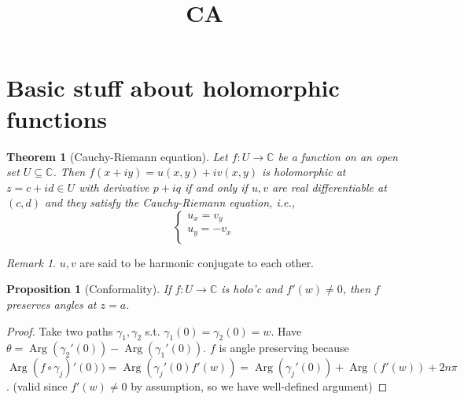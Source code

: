 \documentclass{article}
\title{CA}
\author{ }
\date{ }
\theoremstyle{definition}
\theoremstyle{remark}
\newtheorem{rem}{Remark}
\theoremstyle{plain}
\newtheorem{thm}[defn]{Theorem}
\newtheorem{prop}[defn]{Proposition}
\newcommand{\CC}{\mathbb{C}}
\begin{document}
\maketitle

\section{Basic stuff about holomorphic functions}
\begin{thm}[Cauchy-Riemann equation]
   Let $f:U\to \CC$ be a function on an open set $U\subseteq\CC$. Then $f(x+iy)=u(x,y)+iv(x,y)$ is holomorphic at $z=c+id\in U$ with derivative $p+iq$ if and only if $u,v$ are real differentiable at $(c,d)$ and they satisfy the Cauchy-Riemann equation, i.e.,
    \[\begin{cases}
        u_x=v_y\\
        u_y=-v_x\\
    \end{cases}\]
\end{thm}
\begin{rem}
    $u,v$ are said to be harmonic conjugate to each other.
\end{rem}
\begin{prop}[Conformality]
    If $f:U\to\CC$ is holo'c and $f'(w)\neq 0$, then $f$ preserves angles at $z=a$.
\end{prop}
\begin{proof}
Take two paths $\gamma_1,\gamma_2$ s.t. $\gamma_1(0)=\gamma_2(0)=w$. Have $\theta=\operatorname{Arg}(\gamma_2'(0))-\operatorname{Arg}(\gamma_1'(0))$. $f$ is angle preserving because $\operatorname{Arg}(f\circ\gamma_j)'(0))=\operatorname{Arg}(\gamma_j'(0)f'(w))=\operatorname{Arg}(\gamma_j'(0))+\operatorname{Arg}(f'(w))+2n\pi$. (valid since $f'(w)\neq 0$ by assumption, so we have well-defined argument)  
\end{proof}
\end{document}
